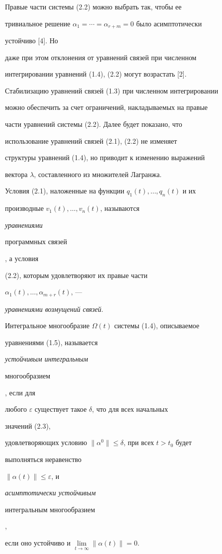  


Правые части системы (2.2) можно выбрать так, чтобы ее 


тривиальное решение $\alpha_1=\dotsb=\alpha_{r+m}=0$ было асимптотически 


устойчиво [4]. Но 


даже при этом отклонения от уравнений связей при численном 


интегрировании уравнений (1.4), (2.2) могут возрастать [2]. 


Стабилизацию уравнений связей (1.3) при численном интегрировании 


можно обеспечить за счет ограничений, накладываемых на правые 


части уравнений системы (2.2). Далее будет показано, что 


использование уравнений связей (2.1), (2.2) не изменяет 


структуры уравнений (1.4), но приводит к изменению выражений 


вектора $\lambda$, составленного из множителей Лагранжа. 


 


\begin{defn} 


Условия (2.1), наложенные на функции $q_1(t),\dotsc,q_n(t)$ и их 


производные $v_1(t),\dotsc,v_n(t)$, называются {\it уравнениями 


программных связей}, а условия 


(2.2), которым удовлетворяют их правые части 


$\alpha_1(t),\dotsc,\alpha_{m+r}(t)$, --- 


{\it уравнениями возмущений связей}. 


\end{defn} 


 


\begin{defn} 


Интегральное многообразие $\Omega(t)$ системы (1.4), описываемое 


уравнениями (1.5), называется {\it устойчивым интегральным 


многообразием}, если для 


любого $\varepsilon$ существует такое $\delta$, что для всех начальных 


значений (2.3), 


удовлетворяющих условию $\|\alpha^0\|\le\delta$, при всех $t>t_0$ будет 


выполняться неравенство 


$\|\alpha(t)\|\le\varepsilon$, и {\it асимптотически устойчивым 


интегральным многообразием}, 


если оно устойчиво и $\lim\limits_{t\to\infty}\|\alpha(t)\|=0$. 


\end{defn} 


